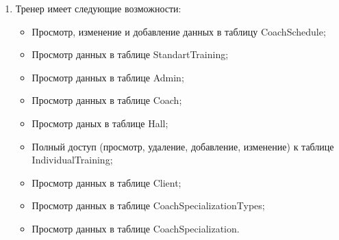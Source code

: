 \begin{enumerate}
    \item Тренер имеет следующие возможности:
    \begin{itemize}
        \item[---] Просмотр, изменение и добавление данных в таблицу CoachSchedule;
        \item[---] Просмотр данных в таблице StandartTraining;
        \item[---] Просмотр данных в таблице Admin;
        \item[---] Просмотр данных в таблице Coach;
        \item[---] Просмотр даных в таблице Hall;
        \item[---] Полный доступ (просмотр, удаление, добавление, изменение) к таблице IndividualTraining;
        \item[---] Просмотр данных в таблице Client;
        \item[---] Просмотр данных в таблице CoachSpecializationTypes;
        \item[---] Просмотр данных в таблице CoachSpecialization.
    \end{itemize}
\end{enumerate}
